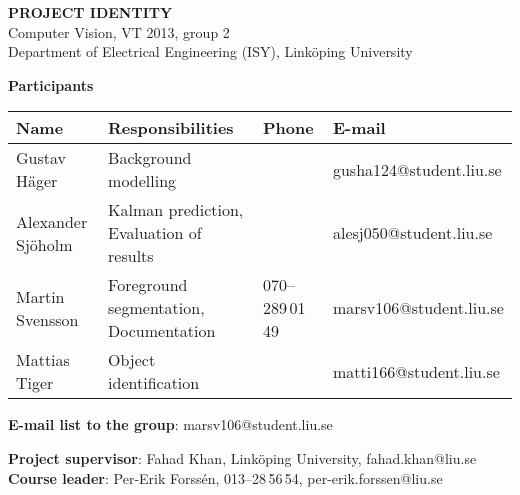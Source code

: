 \begin{center}
    \vspace*{4\baselineskip}

	\textbf{\huge PROJECT IDENTITY} \\
	\vspace*{0.5\baselineskip}
	Computer Vision, VT 2013, group 2 \\
	Department of Electrical Engineering (ISY), Link\"{o}ping University
	
	\vspace*{2\baselineskip}
	\textbf{\LARGE Participants}


	{\footnotesize 
	\begin{tabular}{|p{2.7cm}|p{5cm}|p{2cm}|p{3.4cm}|}
		\hline
			\textbf{Name} & \textbf{Responsibilities} & \textbf{Phone} & \textbf{E-mail} \\
		\hline
		Gustav Häger & Background modelling &  & gusha124@student.liu.se \\
		\hline
		Alexander Sjöholm & Kalman prediction, \newline Evaluation of results &  & alesj050@student.liu.se \\
		\hline
		Martin Svensson & Foreground segmentation, \newline Documentation & 070--289\,01\,49 & marsv106@student.liu.se \\
		\hline
		Mattias Tiger & Object identification &  & matti166@student.liu.se \\
		\hline
	\end{tabular}
	}

{\footnotesize 
\textbf{E-mail list to the group}: marsv106@student.liu.se \\
\vspace{1\baselineskip}

\textbf{Project supervisor}: Fahad Khan, Link\"{o}ping University, fahad.khan@liu.se \\
\textbf{Course leader}: Per-Erik Forssén, 013--28\,56\,54, per-erik.forssen@liu.se \\
}

\end{center}
